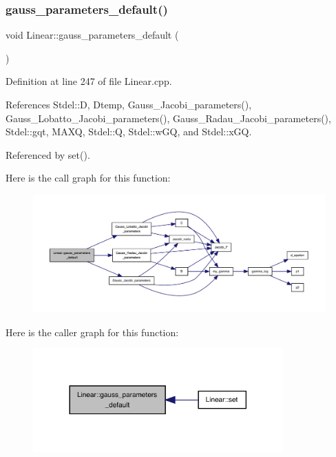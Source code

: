 \subsubsection{\texorpdfstring{gauss\+\_\+parameters\+\_\+default()}{gauss\_parameters\_default()}}
{\footnotesize\ttfamily void Linear\+::gauss\+\_\+parameters\+\_\+default (\begin{DoxyParamCaption}{ }\end{DoxyParamCaption})\hspace{0.3cm}{\ttfamily [private]}}



Definition at line 247 of file Linear.\+cpp.



References Stdel\+::D, Dtemp, Gauss\+\_\+\+Jacobi\+\_\+parameters(), Gauss\+\_\+\+Lobatto\+\_\+\+Jacobi\+\_\+parameters(), Gauss\+\_\+\+Radau\+\_\+\+Jacobi\+\_\+parameters(), Stdel\+::gqt, M\+A\+XQ, Stdel\+::Q, Stdel\+::w\+GQ, and Stdel\+::x\+GQ.



Referenced by set().

Here is the call graph for this function\+:
\nopagebreak
\begin{figure}[H]
\begin{center}
\leavevmode
\includegraphics[width=350pt]{classLinear_a7a27c4d5b5484419361a828ee0640d5d_cgraph}
\end{center}
\end{figure}
Here is the caller graph for this function\+:
\nopagebreak
\begin{figure}[H]
\begin{center}
\leavevmode
\includegraphics[width=272pt]{classLinear_a7a27c4d5b5484419361a828ee0640d5d_icgraph}
\end{center}
\end{figure}
\mbox{\label{classStdel_a0775d0c4f7f15ae26bd45fc949e6f6b9}} 
